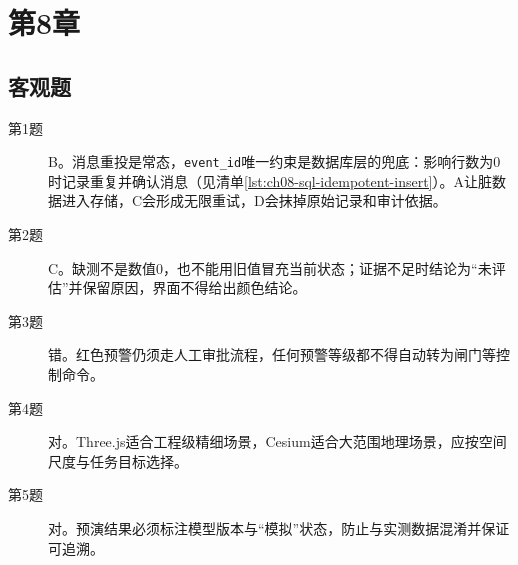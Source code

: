 \section{第8章}

\subsection*{客观题}
\begin{description}
  \item[第1题] B。消息重投是常态，\texttt{event\_id}唯一约束是数据库层的兜底：影响行数为0时记录重复并确认消息（见清单\ref{lst:ch08-sql-idempotent-insert}）。A让脏数据进入存储，C会形成无限重试，D会抹掉原始记录和审计依据。
  \item[第2题] C。缺测不是数值0，也不能用旧值冒充当前状态；证据不足时结论为“未评估”并保留原因，界面不得给出颜色结论。
  \item[第3题] 错。红色预警仍须走人工审批流程，任何预警等级都不得自动转为闸门等控制命令。
  \item[第4题] 对。Three.js适合工程级精细场景，Cesium适合大范围地理场景，应按空间尺度与任务目标选择。
  \item[第5题] 对。预演结果必须标注模型版本与“模拟”状态，防止与实测数据混淆并保证可追溯。
\end{description}

